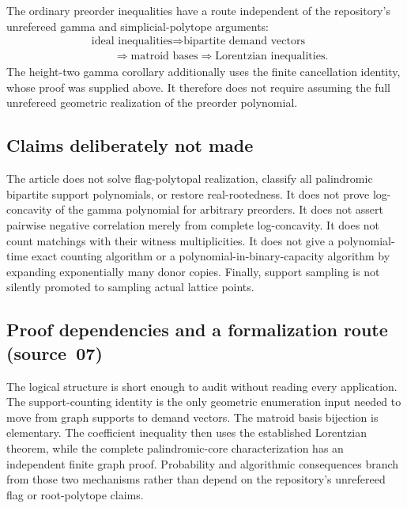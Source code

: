 \documentclass[11pt]{article}
\numberwithin{equation}{section}
\theoremstyle{definition}
\begin{document}
The ordinary preorder inequalities have a route independent of the
repository's unrefereed gamma and simplicial-polytope arguments:
\[
 \begin{aligned}
 &\text{ideal inequalities}
 \Longrightarrow \text{bipartite demand vectors}\\
 &\qquad\Longrightarrow \text{matroid bases}
 \Longrightarrow \text{Lorentzian inequalities}.
 \end{aligned}
\]
The height-two gamma corollary additionally uses the finite cancellation
identity, whose proof was supplied above. It therefore does not require
assuming the full unrefereed geometric realization of the preorder
polynomial.

\subsection{Claims deliberately not made}
The article does not solve flag-polytopal realization, classify all
palindromic bipartite support polynomials, or restore real-rootedness.
It does not prove log-concavity of the gamma polynomial for arbitrary
preorders. It does not assert pairwise negative correlation merely from
complete log-concavity. It does not count matchings with their witness
multiplicities. It does not give a polynomial-time exact counting algorithm
or a polynomial-in-binary-capacity algorithm by expanding exponentially
many donor copies. Finally, support sampling is not silently promoted to
sampling actual lattice points.

\subsection{Proof dependencies and a formalization route (source~07)}
\label{lor:sp:sec:formal}
The logical structure is short enough to audit without reading every
application. The support-counting identity is the only geometric enumeration
input needed to move from graph supports to demand vectors. The matroid basis
bijection is elementary. The coefficient inequality then uses the established
Lorentzian theorem, while the complete palindromic-core characterization has
an independent finite graph proof. Probability and algorithmic consequences
branch from those two mechanisms rather than depend on the repository's
unrefereed flag or root-polytope claims.
\end{document}
